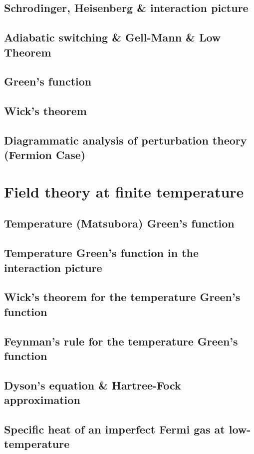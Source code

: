﻿\documentclass[twoside]{book}
\numberwithin{equation}{section}
\begin{document}
\section{Schrodinger, Heisenberg \& interaction picture}
\section{Adiabatic switching \& Gell-Mann \& Low Theorem}
\section{Green's function}
\section{Wick's theorem}
\section{Diagrammatic analysis of perturbation theory (Fermion Case)}



\chapter{Field theory at finite temperature}

\section{Temperature (Matsubora) Green's function}
\section{Temperature Green's function in the interaction picture}
\section{Wick's theorem for the temperature Green's function}
\section{Feynman's rule for the temperature Green's function}
\section{Dyson's equation \& Hartree-Fock approximation}
\section{Specific heat of an imperfect Fermi gas at low-temperature}
\end{document}
